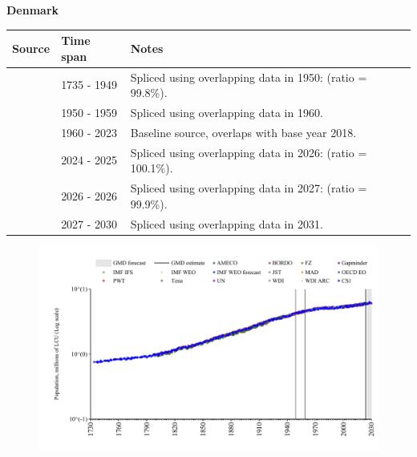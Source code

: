 \documentclass[12pt,a4paper,landscape]{article}
\begin{document}
\begin{adjustbox}{max totalsize={\paperwidth}{\paperheight},center}
\begin{minipage}[t][\textheight][t]{\textwidth}
\vspace*{0.5cm}
{}
\begin{center}
{\Large\bfseries Denmark}
\end{center}
\vspace{0.5cm}
\begin{table}[H]
\centering
\small
\begin{tabular}{|l|l|l|}
\hline
\textbf{Source} & \textbf{Time span} & \textbf{Notes} \\
\hline
\rowcolor{white}\cite{CS1_DNK}& 1735 - 1949 &Spliced using overlapping data in 1950: (ratio = 99.8\%).\\
\rowcolor{lightgray}\cite{IMF_IFS}& 1950 - 1959 &Spliced using overlapping data in 1960.\\
\rowcolor{white}\cite{WDI}& 1960 - 2023 &Baseline source, overlaps with base year 2018.\\
\rowcolor{lightgray}\cite{OECD_EO}& 2024 - 2025 &Spliced using overlapping data in 2026: (ratio = 100.1\%).\\
\rowcolor{white}\cite{AMECO}& 2026 - 2026 &Spliced using overlapping data in 2027: (ratio = 99.9\%).\\
\rowcolor{lightgray}\cite{Gapminder}& 2027 - 2030 &Spliced using overlapping data in 2031.\\
\hline
\end{tabular}
\end{table}
\begin{figure}[H]
\centering
\includegraphics[width=\textwidth,height=0.6\textheight,keepaspectratio]{graphs/DNK_pop.pdf}
\end{figure}
\end{minipage}
\end{adjustbox}
\end{document}
